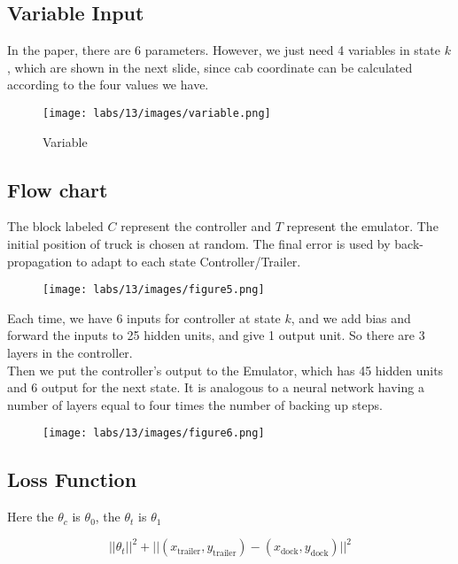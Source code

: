  
\subsection{Variable Input}
In the paper, there are 6 parameters. However, we just need 4 variables in state $k$, which are shown in the next slide, since cab coordinate can be calculated according to the four values we have.
\begin{figure}[H]
    \centering
    \texttt{[image: labs/13/images/variable.png]}
    \caption{Variable}
    \label{fig:variable}
\end{figure}

\subsection{Flow chart}
The block labeled $C$ represent the controller and $T$ represent the emulator. The initial position of truck is chosen at random. The final error is used by back-propagation to adapt to each state Controller/Trailer.
\begin{figure}[H]
    \centering
    \texttt{[image: labs/13/images/figure5.png]}
    \label{fig:loss}
\end{figure}
Each time, we have 6 inputs for controller at state $k$, and we add bias and forward the inputs to 25 hidden units, and give 1 output unit. So there are 3 layers in the controller. 
\\
Then we put the controller's output to the Emulator, which has 45 hidden units and 6 output for the next state. It is analogous to a neural network having a number of layers equal to four times the number of backing up steps.
\begin{figure}[H]
    \centering
    \texttt{[image: labs/13/images/figure6.png]}
    \label{fig:nn}
\end{figure}

\subsection{Loss Function}
Here the $\theta_c$ is $\theta_0$, the $\theta_t$ is $\theta_1$

\begin{equation*}
    ||\theta_{t}||^2 + ||(x_{\text{trailer}}, y_{\text{trailer}}) - (x_{\text{dock}}, y_{\text{dock}})||^2     
\end{equation*}




